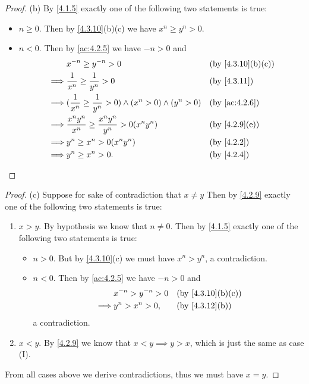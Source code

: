 \begin{proof}{(b)}
  By \cref{4.1.5} exactly one of the following two statements is true:
  \begin{itemize}
    \item \(n \geq 0\).
          Then by \cref{4.3.10}(b)(c) we have \(x^n \geq y^n > 0\).
    \item \(n < 0\).
          Then by \cref{ac:4.2.5} we have \(-n > 0\) and
          \begin{align*}
                     & x^{-n} \geq y^{-n} > 0                                                   &  & \text{(by \cref{4.3.10}(b)(c))} \\
            \implies & \dfrac{1}{x^n} \geq \dfrac{1}{y^n} > 0                                   &  & \by{4.3.11}                     \\
            \implies & (\dfrac{1}{x^n} \geq \dfrac{1}{y^n} > 0) \land (x^n > 0) \land (y^n > 0) &  & \by{ac:4.2.6}                   \\
            \implies & \dfrac{x^n y^n}{x^n} \geq \dfrac{x^n y^n}{y^n} > 0(x^n y^n)              &  & \text{(by \cref{4.2.9}(e))}     \\
            \implies & y^n \geq x^n > 0(x^n y^n)                                                &  & \by{4.2.2}                      \\
            \implies & y^n \geq x^n > 0.                                                        &  & \by{4.2.4}
          \end{align*}
  \end{itemize}
\end{proof}

\begin{proof}{(c)}
  Suppose for sake of contradiction that \(x \neq y\)
  Then by \cref{4.2.9} exactly one of the following two statements is true:
  \begin{enumerate}[label=(\Roman*)]
    \item \(x > y\).
          By hypothesis we know that \(n \neq 0\).
          Then by \cref{4.1.5} exactly one of the following two statements is true:
          \begin{itemize}
            \item \(n > 0\).
                  But by \cref{4.3.10}(c) we must have \(x^n > y^n\), a contradiction.
            \item \(n < 0\).
                  Then by \cref{ac:4.2.5} we have \(-n > 0\) and
                  \begin{align*}
                             & x^{-n} > y^{-n} > 0 &  & \text{(by \cref{4.3.10}(b)(c))} \\
                    \implies & y^n > x^n > 0,      &  & \text{(by \cref{4.3.12}(b))}
                  \end{align*}
                  a contradiction.
          \end{itemize}
    \item \(x < y\).
          By \cref{4.2.9} we know that \(x < y \implies y > x\), which is just the same as case (I).
  \end{enumerate}
  From all cases above we derive contradictions, thus we must have \(x = y\).
\end{proof}

